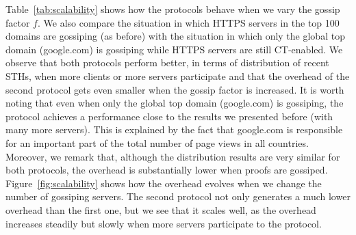 Table~\ref{tab:scalability} shows how the protocols
behave when we vary the gossip factor $f$. We also compare the situation in which HTTPS servers
in the top 100 domains are gossiping (as before) with the situation in which only the global top domain (google.com) is gossiping while HTTPS servers are still CT-enabled. We observe that both protocols perform better, in terms of distribution of recent STHs, when more clients or more servers participate and that the overhead of the second protocol gets even smaller when the gossip factor is increased. It is worth noting that even when only the global top domain (google.com) is gossiping, the protocol achieves a performance close to the results we presented before (with many more servers). This is explained by the fact that google.com is responsible for an important part of the total number of page views in all countries. Moreover, we remark that, although the distribution results are very similar
for both protocols, the overhead is substantially lower when proofs are gossiped.
Figure~\ref{fig:scalability} shows how the overhead evolves when we change the number
of gossiping servers. The second protocol not only generates a much lower overhead
than the first one, but we see that it scales well, as the overhead increases
steadily but slowly when more servers participate to the protocol.

